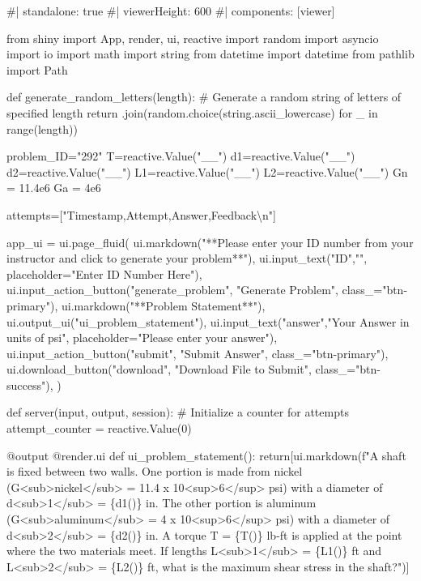 \documentclass[
  letterpaper,
  DIV=11,
  numbers=noendperiod]{scrreprt}
\newenvironment{Shaded}{\begin{snugshade}}{\end{snugshade}}
\newcommand{\NormalTok}[1]{\textcolor[rgb]{0.00,0.23,0.31}{#1}}
\begin{document}
\begin{Shaded}
\begin{Highlighting}[]
\NormalTok{\#| standalone: true}
\NormalTok{\#| viewerHeight: 600}
\NormalTok{\#| components: [viewer]}

\NormalTok{from shiny import App, render, ui, reactive}
\NormalTok{import random}
\NormalTok{import asyncio}
\NormalTok{import io}
\NormalTok{import math}
\NormalTok{import string}
\NormalTok{from datetime import datetime}
\NormalTok{from pathlib import Path}

\NormalTok{def generate\_random\_letters(length):}
\NormalTok{    \# Generate a random string of letters of specified length}
\NormalTok{    return \textquotesingle{}\textquotesingle{}.join(random.choice(string.ascii\_lowercase) for \_ in range(length)) }

\NormalTok{problem\_ID="292"}
\NormalTok{T=reactive.Value("\_\_")}
\NormalTok{d1=reactive.Value("\_\_")}
\NormalTok{d2=reactive.Value("\_\_")}
\NormalTok{L1=reactive.Value("\_\_")}
\NormalTok{L2=reactive.Value("\_\_")}
\NormalTok{Gn = 11.4e6}
\NormalTok{Ga = 4e6}

\NormalTok{attempts=["Timestamp,Attempt,Answer,Feedback\textbackslash{}n"]}

\NormalTok{app\_ui = ui.page\_fluid(}
\NormalTok{    ui.markdown("**Please enter your ID number from your instructor and click to generate your problem**"),}
\NormalTok{    ui.input\_text("ID","", placeholder="Enter ID Number Here"),}
\NormalTok{    ui.input\_action\_button("generate\_problem", "Generate Problem", class\_="btn{-}primary"),}
\NormalTok{    ui.markdown("**Problem Statement**"),}
\NormalTok{    ui.output\_ui("ui\_problem\_statement"),}
\NormalTok{    ui.input\_text("answer","Your Answer in units of psi", placeholder="Please enter your answer"),}
\NormalTok{    ui.input\_action\_button("submit", "Submit Answer", class\_="btn{-}primary"),}
\NormalTok{    ui.download\_button("download", "Download File to Submit", class\_="btn{-}success"),}
\NormalTok{)}


\NormalTok{def server(input, output, session):}
\NormalTok{    \# Initialize a counter for attempts}
\NormalTok{    attempt\_counter = reactive.Value(0)}

\NormalTok{    @output}
\NormalTok{    @render.ui}
\NormalTok{    def ui\_problem\_statement():}
\NormalTok{        return[ui.markdown(f"A shaft is fixed between two walls. One portion is made from nickel (G\textless{}sub\textgreater{}nickel\textless{}/sub\textgreater{} = 11.4 x 10\textless{}sup\textgreater{}6\textless{}/sup\textgreater{} psi) with a diameter of d\textless{}sub\textgreater{}1\textless{}/sub\textgreater{} = \{d1()\} in. The other portion is aluminum (G\textless{}sub\textgreater{}aluminum\textless{}/sub\textgreater{} = 4 x 10\textless{}sup\textgreater{}6\textless{}/sup\textgreater{} psi) with a diameter of d\textless{}sub\textgreater{}2\textless{}/sub\textgreater{} = \{d2()\} in. A torque T = \{T()\} lb{-}ft is applied at the point where the two materials meet. If lengths L\textless{}sub\textgreater{}1\textless{}/sub\textgreater{} = \{L1()\} ft and L\textless{}sub\textgreater{}2\textless{}/sub\textgreater{} = \{L2()\} ft, what is the maximum shear stress in the shaft?")]}
    

\end{Highlighting}
\end{Shaded}
\end{document}
